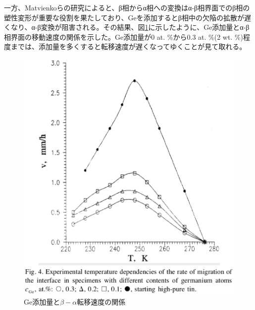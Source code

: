 一方、Matvienkoらの研究\cite{Matvienko}によると、β相からα相への変換はα-β相界面でのβ相の塑性変形が重要な役割を果たしており、Geを添加するとβ相中の欠陥の拡散が遅くなり、α-β変換が阻害される。その結果、図\ref{fig:Ge_content}に示したように、Ge添加量とα-β相界面の移動速度の関係を示した\cite{Matvienko}。Ge添加量が0 at. \%から0.3 at. \%(2 wt. \%)程度までは、添加量を多くすると転移速度が遅くなってゆくことが見て取れる。
\begin{figure}[htb]
    \begin{center}
   \includegraphics[width=130mm]{Introduction/Ge_content.eps}
  \end{center}
  \caption{Ge添加量と$\beta-\alpha$転移速度の関係\cite{Matvienko}}
  \label{fig:Ge_content}
\end{figure}

\newpage
